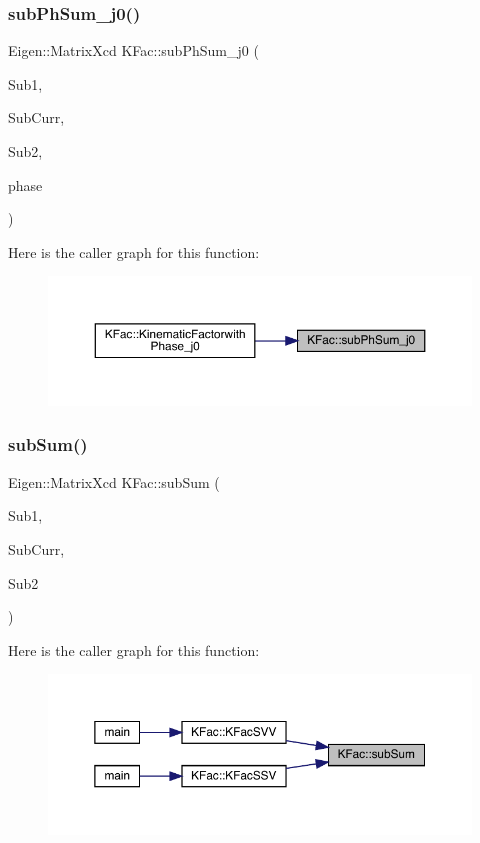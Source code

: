 \subsubsection{\texorpdfstring{subPhSum\_j0()}{subPhSum\_j0()}}
{\footnotesize\ttfamily Eigen\+::\+Matrix\+Xcd K\+Fac\+::sub\+Ph\+Sum\+\_\+j0 (\begin{DoxyParamCaption}\item[{map$<$ int, Eigen\+::\+Matrix\+Xcd $>$ \&}]{Sub1,  }\item[{Eigen\+::\+Matrix\+Xcd \&}]{Sub\+Curr,  }\item[{map$<$ int, Eigen\+::\+Matrix\+Xcd $>$ \&}]{Sub2,  }\item[{\mbox{\hyperlink{structPh_1_1phChars}{Ph\+::ph\+Chars}} \&}]{phase }\end{DoxyParamCaption})}

Here is the caller graph for this function\+:
\nopagebreak
\begin{figure}[H]
\begin{center}
\leavevmode
\includegraphics[width=350pt]{d2/d89/namespaceKFac_abb86856b8424632f8f879408ce2cc05b_icgraph}
\end{center}
\end{figure}
\mbox{\label{namespaceKFac_a3eefd3c3b1834112b9b76444ef00895e}} 
\subsubsection{\texorpdfstring{subSum()}{subSum()}}
{\footnotesize\ttfamily Eigen\+::\+Matrix\+Xcd K\+Fac\+::sub\+Sum (\begin{DoxyParamCaption}\item[{map$<$ int, Eigen\+::\+Matrix\+Xcd $>$ \&}]{Sub1,  }\item[{map$<$ int, Eigen\+::\+Matrix\+Xcd $>$ \&}]{Sub\+Curr,  }\item[{map$<$ int, Eigen\+::\+Matrix\+Xcd $>$ \&}]{Sub2 }\end{DoxyParamCaption})}

Here is the caller graph for this function\+:
\nopagebreak
\begin{figure}[H]
\begin{center}
\leavevmode
\includegraphics[width=350pt]{d2/d89/namespaceKFac_a3eefd3c3b1834112b9b76444ef00895e_icgraph}
\end{center}
\end{figure}
